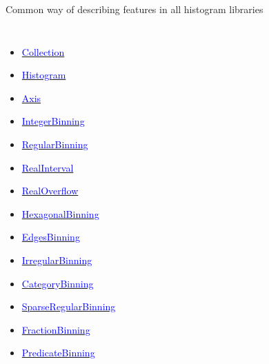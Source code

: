 \documentclass[aspectratio=169]{beamer}
\begin{document}
\begin{frame}{Common way of describing features in all histogram libraries}
\vspace{0.25 cm}
\scriptsize
\begin{columns}[t]
\begin{itemize}
  \item \href{https://github.com/scikit-hep/aghast/blob/master/specification.adoc\#collection}{\textcolor{blue}{Collection}}
  \item \href{https://github.com/scikit-hep/aghast/blob/master/specification.adoc\#histogram}{\textcolor{blue}{Histogram}}
  \item \href{https://github.com/scikit-hep/aghast/blob/master/specification.adoc\#axis}{\textcolor{blue}{Axis}}
  \item \href{https://github.com/scikit-hep/aghast/blob/master/specification.adoc\#integerbinning}{\textcolor{blue}{IntegerBinning}}
  \item \href{https://github.com/scikit-hep/aghast/blob/master/specification.adoc\#regularbinning}{\textcolor{blue}{RegularBinning}}
  \item \href{https://github.com/scikit-hep/aghast/blob/master/specification.adoc\#realinterval}{\textcolor{blue}{RealInterval}}
  \item \href{https://github.com/scikit-hep/aghast/blob/master/specification.adoc\#realoverflow}{\textcolor{blue}{RealOverflow}}
  \item \href{https://github.com/scikit-hep/aghast/blob/master/specification.adoc\#hexagonalbinning}{\textcolor{blue}{HexagonalBinning}}
  \item \href{https://github.com/scikit-hep/aghast/blob/master/specification.adoc\#edgesbinning}{\textcolor{blue}{EdgesBinning}}
  \item \href{https://github.com/scikit-hep/aghast/blob/master/specification.adoc\#irregularbinning}{\textcolor{blue}{IrregularBinning}}
  \item \href{https://github.com/scikit-hep/aghast/blob/master/specification.adoc\#categorybinning}{\textcolor{blue}{CategoryBinning}}
  \item \href{https://github.com/scikit-hep/aghast/blob/master/specification.adoc\#sparseregularbinning}{\textcolor{blue}{SparseRegularBinning}}
  \item \href{https://github.com/scikit-hep/aghast/blob/master/specification.adoc\#fractionbinning}{\textcolor{blue}{FractionBinning}}
  \item \href{https://github.com/scikit-hep/aghast/blob/master/specification.adoc\#predicatebinning}{\textcolor{blue}{PredicateBinning}}

\end{itemize}
\end{columns}
\end{frame}
\end{document}
